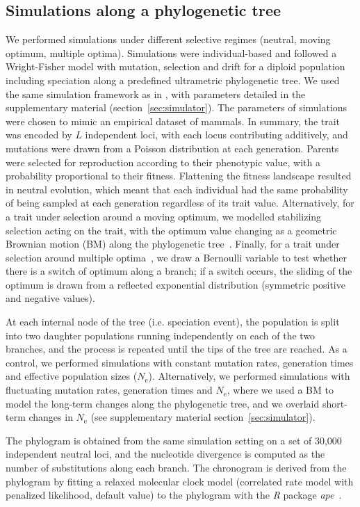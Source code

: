 \documentclass{article}
\newcommand{\Ne}{N_{\text{e}}}
\newcommand{\NbrLoci}{L}
\begin{document}
\subsection*{Simulations along a phylogenetic tree}
We performed simulations under different selective regimes (neutral, moving optimum, multiple optima).
Simulations were individual-based and followed a Wright-Fisher model with mutation, selection and drift for a diploid population including speciation along a predefined ultrametric phylogenetic tree.
We used the same simulation framework as in \citet{latrille_detecting_2024}, with parameters detailed in the supplementary material (section~\ref{sec:simulator}).
The parameters of simulations were chosen to mimic an empirical dataset of mammals.
In summary, the trait was encoded by $\NbrLoci$ independent loci, with each locus contributing additively, and mutations were drawn from a Poisson distribution at each generation.
Parents were selected for reproduction according to their phenotypic value, with a probability proportional to their fitness.
Flattening the fitness landscape resulted in neutral evolution, which meant that each individual had the same probability of being sampled at each generation regardless of its trait value.
Alternatively, for a trait under selection around a moving optimum, we modelled stabilizing selection acting on the trait, with the optimum value changing as a geometric Brownian motion (BM) along the phylogenetic tree~\citep{hansen_stabilizing_1997, hansen_translating_1996}.
Finally, for a trait under selection around multiple optima~\citep{uyeda_novel_2014}, we draw a Bernoulli variable to test whether there is a switch of optimum along a branch; if a switch occurs, the sliding of the optimum is drawn from a reflected exponential distribution (symmetric positive and negative values).

At each internal node of the tree (i.e. speciation event), the population is split into two daughter populations running independently on each of the two branches, and the process is repeated until the tips of the tree are reached.
As a control, we performed simulations with constant mutation rates, generation times and effective population sizes ($\Ne$).
Alternatively, we performed simulations with fluctuating mutation rates, generation times and $\Ne$, where we used a BM to model the long-term changes along the phylogenetic tree, and we overlaid short-term changes in $\Ne$ (see supplementary material section~\ref{sec:simulator}).

The phylogram is obtained from the same simulation setting on a set of 30,000 independent neutral loci, and the nucleotide divergence is computed as the number of substitutions along each branch.
The chronogram is derived from the phylogram by fitting a relaxed molecular clock model (correlated rate model with penalized likelihood, default value) to the phylogram with the \textit{R} package \textit{ape}~\citep{paradis_ape_2004}.
\end{document}
